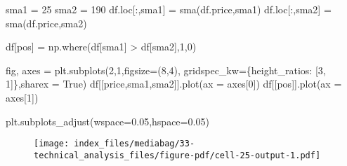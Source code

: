 \documentclass[
  letterpaper,
  DIV=11,
  numbers=noendperiod]{scrreprt}
\newenvironment{Shaded}{\begin{snugshade}}{\end{snugshade}}
\newcommand{\DecValTok}[1]{\textcolor[rgb]{0.68,0.00,0.00}{#1}}
\newcommand{\FloatTok}[1]{\textcolor[rgb]{0.68,0.00,0.00}{#1}}
\newcommand{\NormalTok}[1]{\textcolor[rgb]{0.00,0.23,0.31}{#1}}
\newcommand{\OperatorTok}[1]{\textcolor[rgb]{0.37,0.37,0.37}{#1}}
\newcommand{\StringTok}[1]{\textcolor[rgb]{0.13,0.47,0.30}{#1}}
\newcommand{\VariableTok}[1]{\textcolor[rgb]{0.07,0.07,0.07}{#1}}
\begin{document}
\begin{Shaded}
\begin{Highlighting}[]
\NormalTok{sma1 }\OperatorTok{=} \DecValTok{25}
\NormalTok{sma2 }\OperatorTok{=} \DecValTok{190}
\NormalTok{df.loc[:,}\StringTok{\textquotesingle{}sma1\textquotesingle{}}\NormalTok{] }\OperatorTok{=}\NormalTok{ sma(df.price,sma1)}
\NormalTok{df.loc[:,}\StringTok{\textquotesingle{}sma2\textquotesingle{}}\NormalTok{] }\OperatorTok{=}\NormalTok{ sma(df.price,sma2)}

\NormalTok{df[}\StringTok{\textquotesingle{}pos\textquotesingle{}}\NormalTok{] }\OperatorTok{=}\NormalTok{ np.where(df[}\StringTok{\textquotesingle{}sma1\textquotesingle{}}\NormalTok{] }\OperatorTok{\textgreater{}}\NormalTok{ df[}\StringTok{\textquotesingle{}sma2\textquotesingle{}}\NormalTok{],}\DecValTok{1}\NormalTok{,}\DecValTok{0}\NormalTok{)}

\NormalTok{fig, axes }\OperatorTok{=}\NormalTok{ plt.subplots(}\DecValTok{2}\NormalTok{,}\DecValTok{1}\NormalTok{,figsize}\OperatorTok{=}\NormalTok{(}\DecValTok{8}\NormalTok{,}\DecValTok{4}\NormalTok{), gridspec\_kw}\OperatorTok{=}\NormalTok{\{}\StringTok{\textquotesingle{}height\_ratios\textquotesingle{}}\NormalTok{: [}\DecValTok{3}\NormalTok{, }\DecValTok{1}\NormalTok{]\},sharex }\OperatorTok{=} \VariableTok{True}\NormalTok{)}
\NormalTok{df[[}\StringTok{\textquotesingle{}price\textquotesingle{}}\NormalTok{,}\StringTok{\textquotesingle{}sma1\textquotesingle{}}\NormalTok{,}\StringTok{\textquotesingle{}sma2\textquotesingle{}}\NormalTok{]].plot(ax }\OperatorTok{=}\NormalTok{ axes[}\DecValTok{0}\NormalTok{])}
\NormalTok{df[[}\StringTok{\textquotesingle{}pos\textquotesingle{}}\NormalTok{]].plot(ax }\OperatorTok{=}\NormalTok{ axes[}\DecValTok{1}\NormalTok{])}

\NormalTok{plt.subplots\_adjust(wspace}\OperatorTok{=}\FloatTok{0.05}\NormalTok{,hspace}\OperatorTok{=}\FloatTok{0.05}\NormalTok{)}
\end{Highlighting}
\end{Shaded}

\begin{figure}[H]

{\centering \texttt{[image: index\_files/mediabag/33-technical\_analysis\_files/figure-pdf/cell-25-output-1.pdf]}

}

\end{figure}
\end{document}
